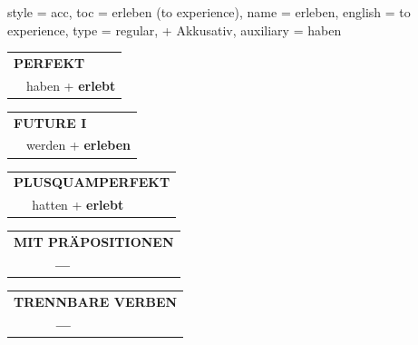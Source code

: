 \begin{verbentry}{
  style = {acc},
  toc = {erleben (to experience)},
  name = {erleben},
  english = {to experience},
  type = {regular, + Akkusativ},
  auxiliary = {haben}
}
\vspace{10pt}

\begin{tabular}{rl}
\multicolumn{2}{l}{\textbf{PERFEKT}}\\
& haben + \textbf{erlebt}\\
\end{tabular}
\hfill
\begin{tabular}{rl}
\multicolumn{2}{l}{\textbf{FUTURE I}}\\
& werden + \textbf{erleben}\\
\end{tabular}
\hfill
\begin{tabular}{rl}
\multicolumn{2}{l}{\textbf{PLUSQUAMPERFEKT}}\\
& hatten + \textbf{erlebt}\\
\end{tabular}

\vspace{10pt}

\begin{tabular}{lll}
\multicolumn{3}{l}{\textbf{MIT PRÄPOSITIONEN}}\\
& \textbf{---} & \\
\end{tabular}
\hfill
\begin{tabular}{lll}
\multicolumn{3}{l}{\textbf{TRENNBARE VERBEN}}\\
& \textbf{---} & \\
\end{tabular}

\vspace{-5pt}
\end{verbentry}


